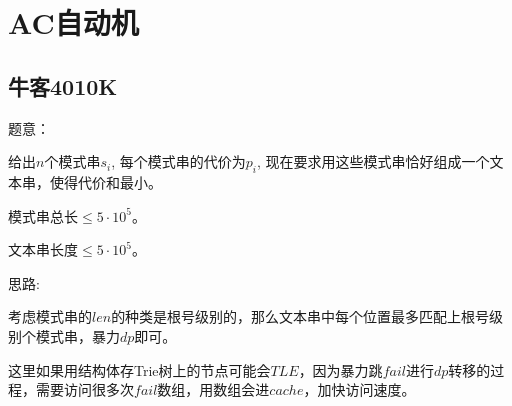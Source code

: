 \section{AC自动机}
\subsection{牛客4010K}
题意：\par
给出$n$个模式串$s_i$, 每个模式串的代价为$p_i$, 现在要求用这些模式串恰好组成一个文本串，使得代价和最小。\par
模式串总长$ \leq 5 \cdot 10^5$。\par
文本串长度$ \leq 5 \cdot 10^5$。\par
思路: \par
考虑模式串的$len$的种类是根号级别的，那么文本串中每个位置最多匹配上根号级别个模式串，暴力$dp$即可。\par
这里如果用结构体存Trie树上的节点可能会$TLE$，因为暴力跳$fail$进行$dp$转移的过程，需要访问很多次$fail$数组，用数组会进$cache$，加快访问速度。\par
